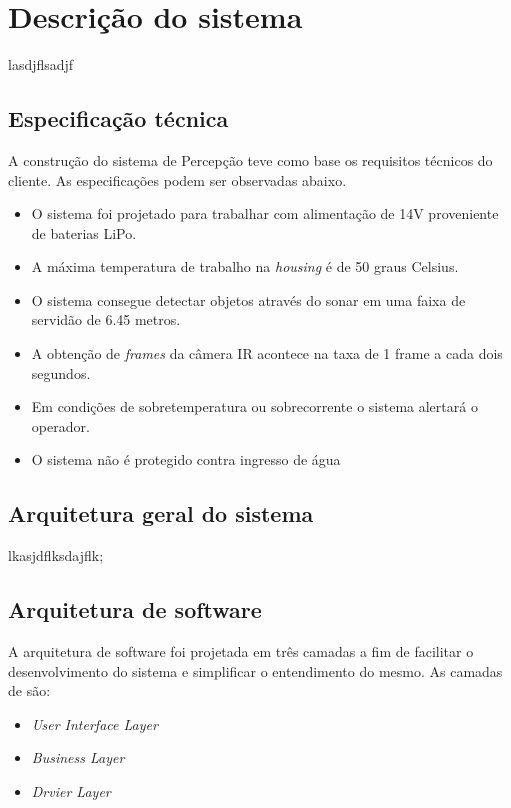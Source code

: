 \section{Descrição do sistema}
\label{sec:desc}
lasdjflsadjf

\subsection{Especificação técnica}
\label{ssec:espt}

A construção do sistema de Percepção teve como base os requisitos técnicos do cliente. As especificações podem ser observadas abaixo.
\begin{itemize}
\item O sistema foi projetado para trabalhar com alimentação de 14V proveniente de baterias LiPo.
\item A máxima temperatura de trabalho na \textit{housing} é de 50 graus Celsius.
\item O sistema consegue detectar objetos através do sonar em uma faixa de servidão de 6.45 metros.
\item A obtenção de \textit{frames} da câmera IR acontece na taxa de 1 frame a cada dois segundos.
\item Em condições de sobretemperatura ou sobrecorrente o sistema alertará o operador.
\item O sistema não é protegido contra ingresso de água
\end{itemize} 

\subsection{Arquitetura geral do sistema}
\label{ssec:arqg}
lkasjdflksdajflk;

\subsection{Arquitetura de software}
\label{ssec:arqs}


A arquitetura de software foi projetada em três camadas a fim de facilitar o desenvolvimento do sistema e simplificar o entendimento do mesmo. As camadas de são:

\begin{itemize}
	\item \textit{User Interface Layer}
	\item \textit{Business Layer}
	\item \textit{Drvier Layer}
\end{itemize}
 
